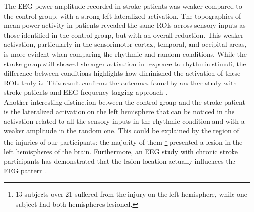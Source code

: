 The EEG power amplitude recorded in stroke patients was weaker compared to the control group, with a strong left-lateralized activation. The topographies of mean power activity in patients revealed the same ROIs across sensory inputs as those identified in the control group, but with an overall reduction. This weaker activation, particularly in the sensorimotor cortex, temporal, and occipital areas, is more evident when comparing the rhythmic and random conditions. While the stroke group still showed stronger activation in response to rhythmic stimuli, the difference between conditions highlights how diminished the activation of these ROIs truly is. This result confirms the outcomes found by another study with stroke patients and EEG frequency tagging approach \parencite{Nozaradan_2017}. \\
Another interesting distinction between the control group and the stroke patient is the lateralized activation on the left hemisphere that can be noticed in the activation related to all the sensory inputs in the rhythmic condition and with a weaker amplitude in the random one. This could be explained by the region of the injuries of our participants: the majority of them \footnote{13 subjects over 21 suffered from the injury on the left hemisphere, while one subject had both hemispheres lesioned.} presented a lesion in the left hemispheres of the brain. Furthermore, an EEG study with chronic stroke participants has demonstrated that the lesion location actually influences the EEG pattern \parencite{Park_2016}.

